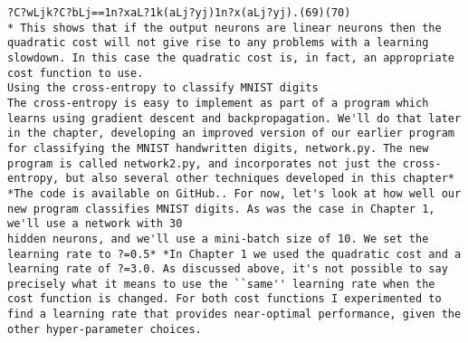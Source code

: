 \begin{lstlisting}
?C?wLjk?C?bLj==1n?xaL?1k(aLj?yj)1n?x(aLj?yj).(69)(70)
* This shows that if the output neurons are linear neurons then the quadratic cost will not give rise to any problems with a learning slowdown. In this case the quadratic cost is, in fact, an appropriate cost function to use. 
Using the cross-entropy to classify MNIST digits
The cross-entropy is easy to implement as part of a program which learns using gradient descent and backpropagation. We'll do that later in the chapter, developing an improved version of our earlier program for classifying the MNIST handwritten digits, network.py. The new program is called network2.py, and incorporates not just the cross-entropy, but also several other techniques developed in this chapter* *The code is available on GitHub.. For now, let's look at how well our new program classifies MNIST digits. As was the case in Chapter 1, we'll use a network with 30
hidden neurons, and we'll use a mini-batch size of 10. We set the learning rate to ?=0.5* *In Chapter 1 we used the quadratic cost and a learning rate of ?=3.0. As discussed above, it's not possible to say precisely what it means to use the ``same'' learning rate when the cost function is changed. For both cost functions I experimented to find a learning rate that provides near-optimal performance, given the other hyper-parameter choices. 


\end{lstlisting}
